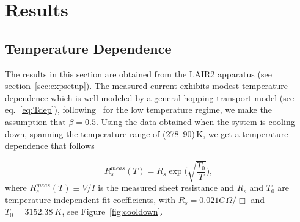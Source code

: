 \documentclass[a4paper,12pt]{article}
\begin{document}

\section{Results}
\label{sec:res}
\subsection{Temperature Dependence}
\label{sec:TNEFit}
The results in this section are obtained from the LAIR2 apparatus (see section~\ref{sec:expsetup}). The measured current exhibits modest temperature dependence which is well modeled by a general hopping transport model (see eq.~\ref{eq:Tdep}), following~\cite{electronicPhotonicMaterials} for the low temperature regime, we make the assumption that $\beta=0.5$. Using the data obtained when the system is cooling down, spanning the temperature range of (278--90)\,K, we get a temperature dependence that follows

\begin{equation}
\label{Rmeas}
R_{s}^{meas}(T)=R_s\exp\bigg(\sqrt{\frac{T_0}{T}}\bigg),
\end{equation}
where $R_{s}^{meas}(T)\equiv V/I$ is the measured sheet resistance and $R_{s}$ and $T_0$ are temperature-independent fit coefficients, with $R_s =0.021 G\Omega/\Box$ and $T_0 = 3152.38~K$, see Figure~\ref{fig:cooldown}. 
\end{document}

